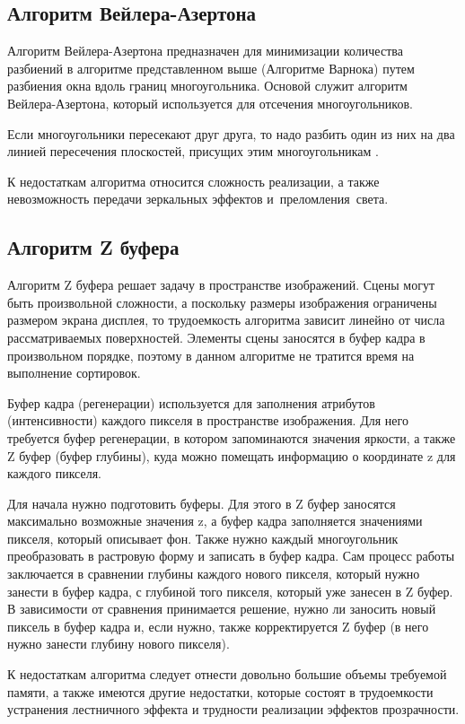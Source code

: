 \subsection{Алгоритм Вейлера-Азертона}

Алгоритм Вейлера-Азертона предназначен для минимизации количества разбиений в алгоритме представленном выше (Алгоритме Варнока) путем разбиения окна вдоль границ многоугольника. Основой служит алгоритм Вейлера-Азертона, который используется для отсечения многоугольников.

Если многоугольники пересекают друг друга, то надо разбить один из них на два линией пересечения плоскостей, присущих этим многоугольникам \cite{tr2}.

К недостаткам алгоритма относится сложность реализации, а также невозможность передачи зеркальных эффектов и преломления света.

\subsection{Алгоритм Z буфера}

Алгоритм Z буфера решает задачу в пространстве изображений. Сцены могут быть произвольной сложности, а поскольку размеры изображения ограничены размером экрана дисплея, то трудоемкость алгоритма зависит линейно от числа рассматриваемых поверхностей. Элементы сцены заносятся в буфер кадра в произвольном порядке, поэтому в данном алгоритме не тратится время на выполнение сортировок.

Буфер кадра (регенерации) используется для заполнения атрибутов (интенсивности) каждого пикселя в пространстве изображения. Для него требуется буфер регенерации, в котором запоминаются значения яркости, а также Z буфер (буфер глубины), куда можно помещать информацию о координате z для каждого пикселя.

Для начала нужно подготовить буферы. Для этого в Z буфер заносятся максимально возможные значения z, а буфер кадра заполняется значениями пикселя, который описывает фон. Также нужно каждый многоугольник преобразовать в растровую форму и записать в буфер кадра. Сам процесс работы заключается в сравнении глубины каждого нового пикселя, который нужно занести в буфер кадра, с глубиной того пикселя, который уже занесен в Z буфер. В зависимости от сравнения принимается решение, нужно ли заносить новый пиксель в буфер кадра и, если нужно, также корректируется Z буфер (в него нужно занести глубину нового пикселя).

К недостаткам алгоритма следует отнести довольно большие объемы требуемой памяти, а также имеются другие недостатки, которые состоят в трудоемкости устранения лестничного эффекта и трудности реализации эффектов прозрачности.

